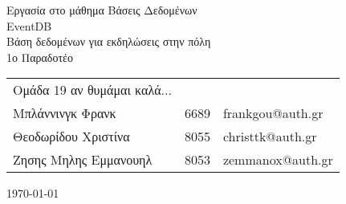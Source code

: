 \documentclass[11pt]{article}
\makeatletter
\newcommand{\ypertitlos}{Εργασία στο μάθημα Βάσεις Δεδομένων}
\newcommand{\titlos}{EventDB}
\newcommand{\ypotitlos}{Βάση δεδομένων για εκδηλώσεις στην πόλη}
\newcommand{\paradoteo}{1ο Παραδοτέο}
\newcommand{\omada}{Ομάδα 19 αν θυμάμαι καλά...}
\newcommand{\student}[3]{#1&#2&#3\\}
\newcommand{\melosA}{\student{Μπλάννινγκ
      Φρανκ}{6689}{frankgou@auth.gr}}
\newcommand{\melosB}{\student{Θεοδωρίδου Χριστίνα}{8055}{christtk@auth.gr}}
\newcommand{\melosC}{\student{Ζησης Μηλης Εμμανουηλ}{8053}{zemmanox@auth.gr}}
\newcommand{\hmnia}{\today}
\makeatother
\begin{document}
  \thispagestyle{empty}
  {\centering
    \Large\ypertitlos\\
    \vspace{7cm}
    \Huge\titlos\\
    \Large\ypotitlos\\
    \vspace{2cm}
  }
  \hfill \paradoteo
  
  \vspace{8cm}
  \begin{tabular}[b]{l l l}
    \omada&&\\
    \melosA
    \melosB 
    \melosC
  \end{tabular}
  
  {\centering
    \vspace{2cm}
    \hmnia\\
  }
  \newpage

  \tableofcontents
  \listoffigures

  \newpage
  
  
  
  
  
  

\end{document}
